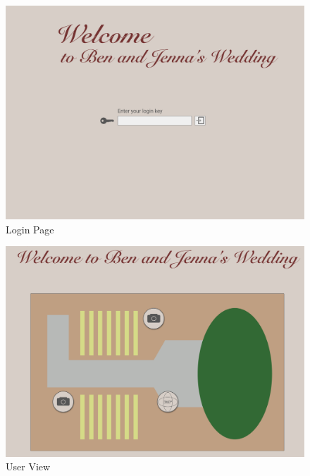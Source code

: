 \documentclass[onecolumn, draftclsnofoot,10pt, compsoc]{IEEEtran}
\begin{document}
        \begin{figure}[H]
            \centering
            \captionsetup{justification=centering,margin=2cm}
            \includegraphics[scale=0.2]{Images/desktop-login.png}
            \centering\caption{Login Page}
            \label{fig:Login}
        \end{figure}
        \begin{figure}[H]
            \centering
            \captionsetup{justification=centering,margin=2cm}
            \includegraphics[scale=0.2]{Images/desktop-main.png}
            \centering\caption{User View}
            \label{fig:User}
        \end{figure}
\end{document}
